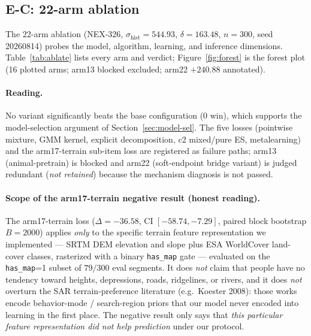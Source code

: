 \documentclass[11pt]{article}
\begin{document}
\subsection{E-C: 22-arm ablation}
\label{sec:exp-c}
The 22-arm ablation (NEX-326, $\sigma_{\mathrm{hist}}{=}544.93$,
$\delta{=}163.48$, $n{=}300$, seed 20260814) probes the model, algorithm,
learning, and inference dimensions. Table~\ref{tab:ablate} lists every arm
and verdict; Figure~\ref{fig:forest} is the forest plot (16 plotted arms;
arm13 blocked excluded; arm22 $+240.88$ annotated).

\begin{table}[htbp]
\centering
\caption{22-arm ablation: 0 win / 5 loss (arms 2,4,5,9,14) + arm17-terrain
sub-item loss ($\Delta=-36.58$) / 16 redundant / 1 blocked (arm13). arm22
($+240.88$, CI all-positive) is judged \emph{redundant} (\emph{not retained}),
not win, because the mechanism diagnosis is not passed.}
\label{tab:ablate}
\small

\end{table}

\paragraph{Reading.} No variant significantly beats the base configuration
(0 win), which supports the model-selection argument of
Section~\ref{sec:model-sel}. The five losses (pointwise mixture, GMM kernel,
explicit decomposition, c2 mixed/pure ES, metalearning) and the
arm17-terrain sub-item loss are registered as failure paths; arm13
(animal-pretrain) is blocked and arm22 (soft-endpoint bridge variant) is judged
redundant (\emph{not retained}) because the mechanism diagnosis is not passed.

\paragraph{Scope of the arm17-terrain negative result (honest reading).}
The arm17-terrain loss ($\Delta=-36.58$, CI $[-58.74,-7.29]$, paired block
bootstrap $B=2000$) applies \emph{only} to the specific terrain feature
representation we implemented --- SRTM DEM elevation and slope plus ESA WorldCover
land-cover classes, rasterized with a binary \texttt{has\_map} gate --- evaluated on
the \texttt{has\_map}=1 subset of $79/300$ eval segments. It does \emph{not} claim
that people have no tendency toward heights, depressions, roads, ridgelines, or
rivers, and it does \emph{not} overturn the SAR terrain-preference literature
(e.g.\ Koester 2008): those works encode behavior-mode / search-region priors that
our model never encoded into learning in the first place. The negative result only
says that \emph{this particular feature representation did not help prediction} under
our protocol.
\end{document}
